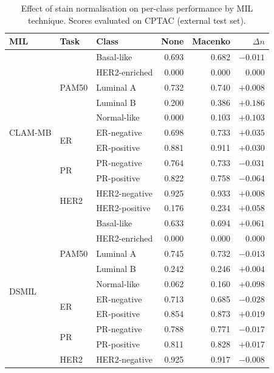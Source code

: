 \begin{table}[htbp]
\centering
\caption{Effect of stain normalisation on per-class performance by MIL technique. Scores evaluated on CPTAC (external test set).}
\label{tab:stain-norm-detailed}
\begin{tabular}{lllrrr}
\toprule
\textbf{MIL} & \textbf{Task} & \textbf{Class} & \textbf{None} & \textbf{Macenko} & $\Delta n$ \\
\midrule
  \multirow{11}{*}{CLAM-MB} & \multirow{5}{*}{PAM50} & Basal-like & 0.693 & 0.682 & $-0.011$ \\
    &   & HER2-enriched & 0.000 & 0.000 & $0.000$ \\
    &   & Luminal A & 0.732 & 0.740 & $+0.008$ \\
    &   & Luminal B & 0.200 & 0.386 & $+0.186$ \\
    &   & Normal-like & 0.000 & 0.103 & $+0.103$ \\
\cmidrule{2-6}
    & \multirow{2}{*}{ER} & ER-negative & 0.698 & 0.733 & $+0.035$ \\
    &   & ER-positive & 0.881 & 0.911 & $+0.030$ \\
\cmidrule{2-6}
    & \multirow{2}{*}{PR} & PR-negative & 0.764 & 0.733 & $-0.031$ \\
    &   & PR-positive & 0.822 & 0.758 & $-0.064$ \\
\cmidrule{2-6}
    & \multirow{2}{*}{HER2} & HER2-negative & 0.925 & 0.933 & $+0.008$ \\
    &   & HER2-positive & 0.176 & 0.234 & $+0.058$ \\
\midrule
  \multirow{11}{*}{DSMIL} & \multirow{5}{*}{PAM50} & Basal-like & 0.633 & 0.694 & $+0.061$ \\
    &   & HER2-enriched & 0.000 & 0.000 & $0.000$ \\
    &   & Luminal A & 0.745 & 0.732 & $-0.013$ \\
    &   & Luminal B & 0.242 & 0.246 & $+0.004$ \\
    &   & Normal-like & 0.062 & 0.160 & $+0.098$ \\
\cmidrule{2-6}
    & \multirow{2}{*}{ER} & ER-negative & 0.713 & 0.685 & $-0.028$ \\
    &   & ER-positive & 0.854 & 0.873 & $+0.019$ \\
\cmidrule{2-6}
    & \multirow{2}{*}{PR} & PR-negative & 0.788 & 0.771 & $-0.017$ \\
    &   & PR-positive & 0.811 & 0.828 & $+0.017$ \\
\cmidrule{2-6}
    & \multirow{2}{*}{HER2} & HER2-negative & 0.925 & 0.917 & $-0.008$ \\

\end{tabular}
\end{table}
